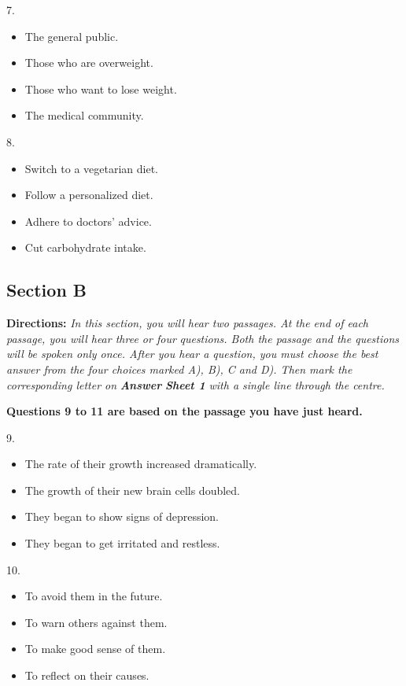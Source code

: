 \documentclass[UTF8,11pt]{ctexart}
\begin{document}
7.


\begin{itemize}[leftmargin=2em,itemsep=.2em,topsep=.4em]\item[A.] The general public.
\item[B.] Those who are overweight.
\item[C.] Those who want to lose weight.
\item[D.] The medical community.
\end{itemize}

8.


\begin{itemize}[leftmargin=2em,itemsep=.2em,topsep=.4em]\item[A.] Switch to a vegetarian diet.
\item[B.] Follow a personalized diet.
\item[C.] Adhere to doctors’ advice.
\item[D.] Cut carbohydrate intake.
\end{itemize}

\subsection*{\textbf{Section B}}


\textbf{Directions:} \textit{In this section, you will hear two passages. At the end of each passage, you will hear three or four} \textit{questions. Both the passage and the questions will be spoken only once. After you hear a question, you must choose} \textit{the best answer from the four choices marked A), B), C and D). Then mark the corresponding letter on }\textbf{\textit{Answer}} \textbf{\textit{Sheet 1}}\textit{ with a single line through the centre.}


\textbf{Questions 9 to 11 are based on the passage you have just heard.}


9.


\begin{itemize}[leftmargin=2em,itemsep=.2em,topsep=.4em]\item[A.] The rate of their growth increased dramatically.
\item[B.] The growth of their new brain cells doubled.
\item[C.] They began to show signs of depression.
\item[D.] They began to get irritated and restless.
\end{itemize}

10.


\begin{itemize}[leftmargin=2em,itemsep=.2em,topsep=.4em]\item[A.] To avoid them in the future.
\item[B.] To warn others against them.
\item[C.] To make good sense of them.
\item[D.] To reflect on their causes.
\end{itemize}
\end{document}
